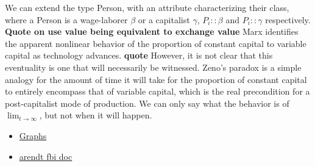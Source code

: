 \documentclass[12pt]{article}
\begin{document}
We can extend the type Person, with an attribute characterizing their class, where a Person is a wage-laborer $\beta$ or a capitalist $\gamma$, $P_i::\beta$ and $P_i::\gamma$ respectively.
\textbf{Quote on use value being equivalent to exchange value}
Marx identifies the apparent nonlinear behavior of the proportion of constant capital to variable capital as technology advances.
 \textbf{quote}
However, it is not clear that this eventuality is one that will necessarily be witnessed.
Zeno's paradox is a simple analogy for the amount of time it will take for the proportion of constant capital to entirely encompass that of variable capital, which is the real precondition for a post-capitalist mode of production.
	We can only say what the behavior is of $\lim_{t \to \infty}$, but not when it will happen.

\begin{itemize}
    \item \href{https://en.wikipedia.org/wiki/Graph_(abstract_data_type)}{Graphs}
	\item \href{https://archive.org/details/HannahArendt/page/n1/mode/2up}{arendt fbi doc}
\end{itemize}

\end{document}
